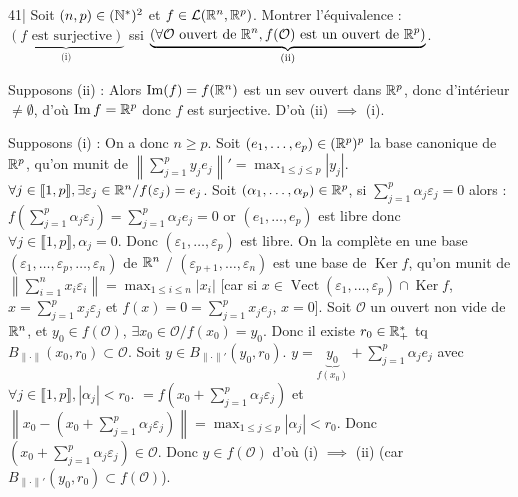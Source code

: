 
\begin{statementbox}
41| Soit $(n, p) \in (\mathbb N^*)^2$ et $f \in \mathcal{L}(\mathbb R^n, \mathbb R^p)$.
Montrer l'équivalence : $\underbrace{(f \text{ est surjective})}_{\text{(i)}}$ ssi $\underbrace{(\forall \mathcal{O} \text{ ouvert de } \mathbb R^n, f(\mathcal{O}) \text{ est un ouvert de } \mathbb R^p)}_{\text{(ii)}}$.
\end{statementbox}

\begin{solution}
Supposons (ii) : Alors $\operatorname{Im}(f) = f(\mathbb R^n)$ est un sev ouvert dans $\mathbb R^p$, donc d'intérieur $\neq \emptyset$, d'où $\operatorname{Im} f = \mathbb R^p$ donc $f$ est surjective. D'où (ii) $\implies$ (i).

Supposons (i) : On a donc $n \geq p$. Soit $(e_1, \dots, e_p) \in (\mathbb R^p)^p$ la base canonique de $\mathbb R^p$, qu'on munit de $\left\|\sum_{j=1}^p y_j e_j\right\|' = \max_{1 \leq j \leq p} |y_j|$. $\forall j \in \llbracket 1, p \rrbracket, \exists \varepsilon_j \in \mathbb R^n / f(\varepsilon_j) = e_j$.
Soit $(\alpha_1, \dots, \alpha_p) \in \mathbb R^p$, si $\sum_{j=1}^p \alpha_j \varepsilon_j = 0$ alors : $f\left(\sum_{j=1}^p \alpha_j \varepsilon_j\right) = \sum_{j=1}^p \alpha_j e_j = 0$ or $(e_1, \dots, e_p)$ est libre donc $\forall j \in \llbracket 1, p \rrbracket, \alpha_j = 0$. Donc $(\varepsilon_1, \dots, \varepsilon_p)$ est libre.
On la complète en une base $(\varepsilon_1, \dots, \varepsilon_p, \dots, \varepsilon_n)$ de $\mathbb R^n$ / $(\varepsilon_{p+1}, \dots, \varepsilon_n)$ est une base de $\operatorname{Ker} f$, qu'on munit de $\left\|\sum_{i=1}^n x_i \varepsilon_i\right\| = \max_{1 \leq i \leq n} |x_i|$ [car si $x \in \operatorname{Vect}(\varepsilon_1, \dots, \varepsilon_p) \cap \operatorname{Ker} f$, $x = \sum_{j=1}^p x_j \varepsilon_j$ et $f(x) = 0 = \sum_{j=1}^p x_j e_j$, $x = 0$].
Soit $\mathcal{O}$ un ouvert non vide de $\mathbb R^n$, et $y_0 \in f(\mathcal{O})$, $\exists x_0 \in \mathcal{O} / f(x_0) = y_0$.
Donc il existe $r_0 \in \mathbb R_+^*$ tq $B_{\|\cdot\|}(x_0, r_0) \subset \mathcal{O}$. Soit $y \in B_{\|\cdot\|'}(y_0, r_0)$.
$y = \underbrace{y_0}_{f(x_0)} + \sum_{j=1}^p \alpha_j e_j$ avec $\forall j \in \llbracket 1, p \rrbracket, |\alpha_j| < r_0$.
$= f\left(x_0 + \sum_{j=1}^p \alpha_j \varepsilon_j\right)$ et $\left\|x_0 - \left(x_0 + \sum_{j=1}^p \alpha_j \varepsilon_j\right)\right\| = \max_{1 \leq j \leq p} |\alpha_j| < r_0$.
Donc $\left(x_0 + \sum_{j=1}^p \alpha_j \varepsilon_j\right) \in \mathcal{O}$. Donc $y \in f(\mathcal{O})$ d'où (i) $\implies$ (ii) (car $B_{\|\cdot\|'}(y_0, r_0) \subset f(\mathcal{O})$).
\end{solution}

